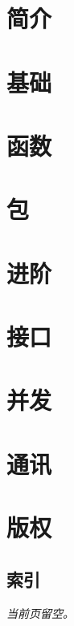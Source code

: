 \documentclass[twoside,openleft]{blocksbook}
\begin{document}
\begin{cjkc}
\chapter{简介}
\label{chap:intro}


\chapter{基础}
\label{chap:basics}


\chapter{函数}
\label{chap:functions}


\chapter{包}
\label{chap:packages}


\chapter{进阶}
\label{chap:beyond}


\chapter{接口}
\label{chap:interfaces}


\chapter{并发}
\label{chap:channels}


\chapter{通讯}
\label{chap:communication}



\appendix

\chapter{版权}


\begin{twocolumn}
\chapter{索引}
\printindex
\end{twocolumn}
\begin{onecolumn}



\newpage
\thispagestyle{empty}
\begin{center}
\emph{当前页留空。}
\end{center}
\end{onecolumn}
\end{cjkc}
\end{document}
